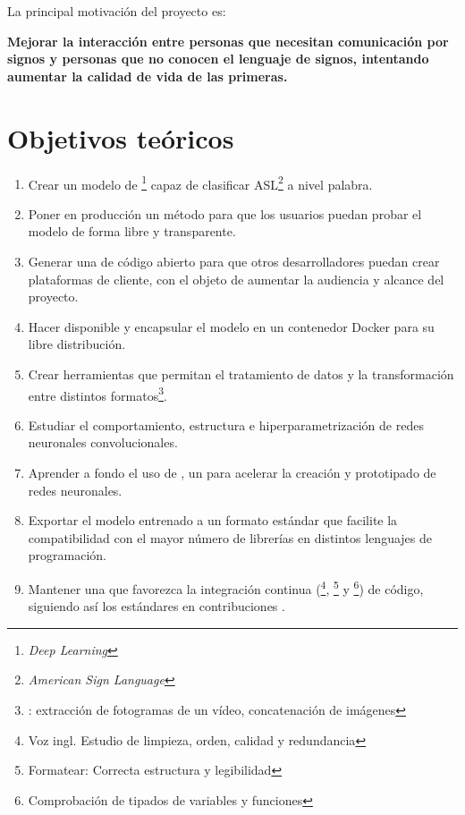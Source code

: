 
La principal motivación del proyecto es:

\textbf{
  Mejorar la interacción entre personas que necesitan comunicación por signos y personas que no conocen el lenguaje de signos, intentando aumentar la calidad de vida de las primeras.
}


\section{Objetivos teóricos}

\begin{enumerate}
  \item Crear un modelo de \footnote{\textit{Deep Learning}} capaz de clasificar ASL\footnote{\textit{American Sign Language}} a nivel palabra.
  \item Poner en producción un método para que los usuarios puedan probar el modelo de forma libre y transparente.
  \item Generar una  de código abierto para que otros desarrolladores puedan crear plataformas de cliente, con el objeto de aumentar la audiencia y alcance del proyecto.
  \item Hacer disponible y encapsular el modelo en un contenedor Docker para su libre distribución.
  \item Crear herramientas que permitan el tratamiento de datos y la transformación entre distintos formatos\footnote{\pe: extracción de fotogramas de un vídeo, concatenación de imágenes}.
  \item Estudiar el comportamiento, estructura e hiperparametrización de redes neuronales convolucionales.
  \item Aprender a fondo el uso de , un  para acelerar la creación y prototipado de redes neuronales.
  \item Exportar el modelo entrenado a un formato estándar que facilite la compatibilidad con el mayor número de librerías en distintos lenguajes de programación.
  \item Mantener una  que favorezca la integración continua (\footnote{Voz ingl. Estudio de limpieza, orden, calidad y redundancia}, \footnote{Formatear: Correcta estructura y legibilidad} y \footnote{Comprobación de tipados de variables y funciones}) de código, siguiendo así los estándares en contribuciones .
\end{enumerate}


